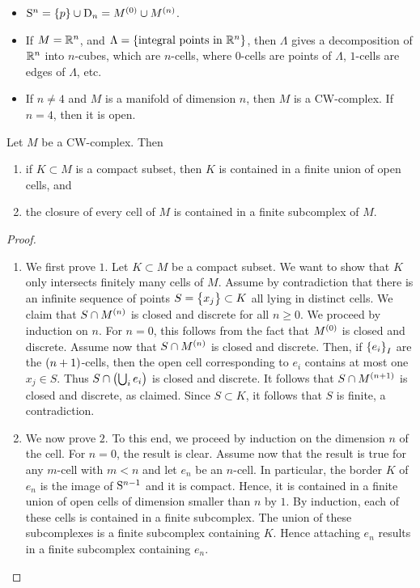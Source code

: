 \begin{example}
\hfill
\begin{itemize}
\item $ \S^n = \cbr{p} \cup \D_n = M^{\br{0}} \cup M^{\br{n}} $.
\item If $ M = \RR^n $, and $ \Lambda = \cbr{\text{integral points in} \ \RR^n} $, then $ \Lambda $ gives a decomposition of $ \RR^n $ into $ n $-cubes, which are $ n $-cells, where $ 0 $-cells are points of $ \Lambda $, $ 1 $-cells are edges of $ \Lambda $, etc.
\item If $ n \ne 4 $ and $ M $ is a manifold of dimension $ n $, then $ M $ is a CW-complex. If $ n = 4 $, then it is open.
\end{itemize}
\end{example}

\pagebreak

\begin{proposition}
\label{prop:3.11}
Let $ M $ be a CW-complex. Then
\begin{enumerate}
\item if $ K \subset M $ is a compact subset, then $ K $ is contained in a finite union of open cells, and
\item the closure of every cell of $ M $ is contained in a finite subcomplex of $ M $.
\end{enumerate}
\end{proposition}

\begin{proof}
\hfill
\begin{enumerate}
\item We first prove $ 1 $. Let $ K \subset M $ be a compact subset. We want to show that $ K $ only intersects finitely many cells of $ M $. Assume by contradiction that there is an infinite sequence of points $ S = \cbr{x_j} \subset K $ all lying in distinct cells. We claim that $ S \cap M^{\br{n}} $ is closed and discrete for all $ n \ge 0 $. We proceed by induction on $ n $. For $ n = 0 $, this follows from the fact that $ M^{\br{0}} $ is closed and discrete. Assume now that $ S \cap M^{\br{n}} $ is closed and discrete. Then, if $ \cbr{e_i}_I $ are the $ \br{n + 1} $-cells, then the open cell corresponding to $ e_i $ contains at most one $ x_j \in S $. Thus $ S \cap \br{\bigcup_i e_i} $ is closed and discrete. It follows that $ S \cap M^{\br{n + 1}} $ is closed and discrete, as claimed. Since $ S \subset K $, it follows that $ S $ is finite, a contradiction.
\item We now prove $ 2 $. To this end, we proceed by induction on the dimension $ n $ of the cell. For $ n = 0 $, the result is clear. Assume now that the result is true for any $ m $-cell with $ m < n $ and let $ e_n $ be an $ n $-cell. In particular, the border $ K $ of $ e_n $ is the image of $ \S^{n - 1} $ and it is compact. Hence, it is contained in a finite union of open cells of dimension smaller than $ n $ by $ 1 $. By induction, each of these cells is contained in a finite subcomplex. The union of these subcomplexes is a finite subcomplex containing $ K $. Hence attaching $ e_n $ results in a finite subcomplex containing $ e_n $.
\end{enumerate}
\end{proof}

